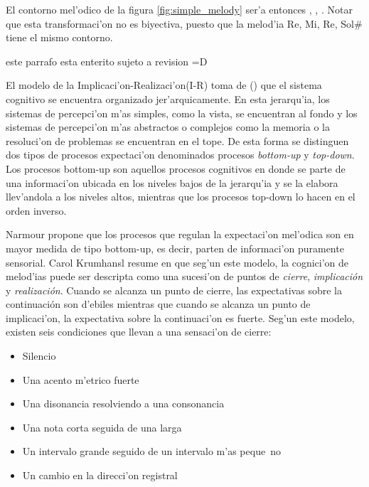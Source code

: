 \begin{imagen}
    \width{11cm}
\end{imagen}

El contorno mel'odico de la figura \ref{fig:simple_melody} ser'a entonces , , .
Notar que esta transformaci'on no es biyectiva, puesto que la melod'ia Re, Mi, Re, Sol\# tiene el mismo contorno.

\alert{este parrafo esta enterito sujeto a revision =D}

El modelo de la Implicaci'on-Realizaci'on(I-R) toma de (\cita) que el sistema cognitivo se encuentra organizado jer'arquicamente. En esta jerarqu'ia, los sistemas 
de percepci'on m'as simples, como la vista, se encuentran al fondo y los sistemas de percepci'on m'as abstractos o complejos como la memoria o la 
resoluci'on de problemas se encuentran en el tope. De esta forma se distinguen dos tipos de procesos expectaci'on denominados procesos \emph{bottom-up} 
y \emph{top-down}. Los procesos bottom-up son aquellos procesos cognitivos en donde se parte de una informaci'on ubicada en los niveles bajos de la jerarqu'ia y se la 
elabora llev'andola a los niveles altos, mientras que los procesos top-down lo hacen en el orden inverso. 

Narmour propone que los procesos que regulan la expectaci'on mel'odica son en mayor medida de tipo bottom-up, es decir, parten de informaci'on puramente sensorial. 
Carol Krumhansl resume en \citep{Krumhansl95} que seg'un este modelo, la cognici'on de melod'ias puede ser descripta como una sucesi'on de puntos 
de \emph{cierre}, \emph{implicaci\'on} y \emph{realizaci\'on}. Cuando se alcanza un punto de cierre, las expectativas sobre la continuaci\'on 
son d'ebiles mientras que cuando se alcanza un punto de implicaci'on, la expectativa sobre la continuaci'on es fuerte. Seg'un este modelo,
existen seis condiciones que llevan a una sensaci'on de cierre:
\begin{itemize}
 \item Silencio
 \item Una acento m'etrico fuerte
 \item Una disonancia resolviendo a una consonancia
 \item Una nota corta seguida de una larga
 \item Un intervalo grande seguido de un intervalo m'as peque~no
 \item Un cambio en la direcci'on registral
\end{itemize}

